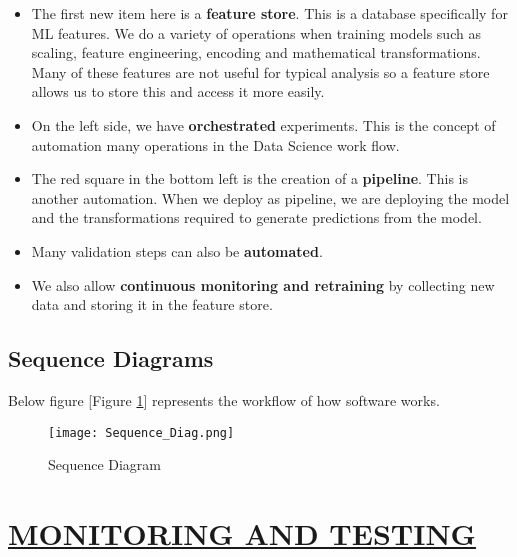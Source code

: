 \documentclass[12pt,oneside,a4paper]{report}
\begin{document}
\begin{itemize}
\item The first new item here is a \textbf{feature store}. This is a database specifically for ML features. We do a variety of operations when training models such as scaling, feature engineering, encoding and mathematical transformations. Many of these features are not useful for typical analysis so a feature store allows us to store this and access it more easily.
\item On the left side, we have \textbf{orchestrated} experiments. This is the concept of automation many operations in the Data Science work flow.
\item The red square in the bottom left is the creation of a \textbf{pipeline}. This is another automation. When we deploy as pipeline, we are deploying the model and the transformations required to generate predictions from the model.
\item Many validation steps can also be \textbf{automated}.
\item We also allow \textbf{continuous monitoring and retraining} by collecting new data and storing it in the feature store.
\end{itemize}

\section{Sequence Diagrams}
\fontsize{12pt}{10pt}\selectfont
Below figure [Figure \ref{fig_Sequence_Diag}] represents the workflow of how software works.


\begin{figure}[h]
\centering
\texttt{[image: Sequence\_Diag.png]}
\caption{Sequence Diagram}
\label{fig_Sequence_Diag}
\end{figure}

\chapter{\underline{MONITORING AND TESTING}}
\end{document}
